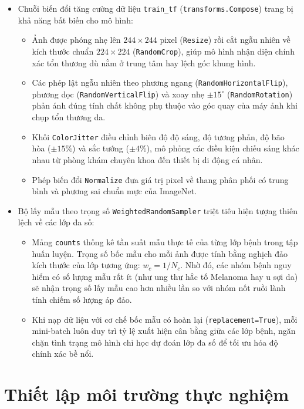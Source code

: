 \begin{itemize}
  \item Chuỗi biến đổi tăng cường dữ liệu \texttt{train\_tf} (\texttt{transforms.Compose}) trang bị khả năng bất biến cho mô hình:
  \begin{itemize}
    \item Ảnh được phóng nhẹ lên $244 \times 244$ pixel (\texttt{Resize}) rồi cắt ngẫu nhiên về kích thước chuẩn $224 \times 224$ (\texttt{RandomCrop}), giúp mô hình nhận diện chính xác tổn thương dù nằm ở trung tâm hay lệch góc khung hình.
    \item Các phép lật ngẫu nhiên theo phương ngang (\texttt{RandomHorizontalFlip}), phương dọc (\texttt{RandomVerticalFlip}) và xoay nhẹ $\pm 15^\circ$ (\texttt{RandomRotation}) phản ánh đúng tính chất không phụ thuộc vào góc quay của máy ảnh khi chụp tổn thương da.
    \item Khối \texttt{ColorJitter} điều chỉnh biên độ độ sáng, độ tương phản, độ bão hòa ($\pm 15\%$) và sắc tướng ($\pm 4\%$), mô phỏng các điều kiện chiếu sáng khác nhau từ phòng khám chuyên khoa đến thiết bị di động cá nhân.
    \item Phép biến đổi \texttt{Normalize} đưa giá trị pixel về thang phân phối có trung bình và phương sai chuẩn mực của ImageNet.
  \end{itemize}
  \item Bộ lấy mẫu theo trọng số \texttt{WeightedRandomSampler} triệt tiêu hiện tượng thiên lệch về các lớp đa số:
  \begin{itemize}
    \item Mảng \texttt{counts} thống kê tần suất mẫu thực tế của từng lớp bệnh trong tập huấn luyện. Trọng số bốc mẫu cho mỗi ảnh được tính bằng nghịch đảo kích thước của lớp tương ứng: $w_c = 1 / N_c$. Nhờ đó, các nhóm bệnh nguy hiểm có số lượng mẫu rất ít (như ung thư hắc tố Melanoma hay u sợi da) sẽ nhận trọng số lấy mẫu cao hơn nhiều lần so với nhóm nốt ruồi lành tính chiếm số lượng áp đảo.
    \item Khi nạp dữ liệu với cơ chế bốc mẫu có hoàn lại (\texttt{replacement=True}), mỗi mini-batch luôn duy trì tỷ lệ xuất hiện cân bằng giữa các lớp bệnh, ngăn chặn tình trạng mô hình chỉ học dự đoán lớp đa số để tối ưu hóa độ chính xác bề nổi.
  \end{itemize}
\end{itemize}


\section{Thiết lập môi trường thực nghiệm}

